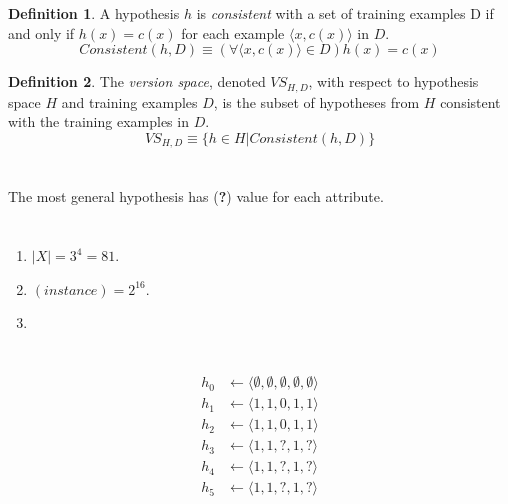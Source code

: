 \documentclass[10pt]{article}
\theoremstyle{definition}
\newtheorem{definition}{Definition}
\begin{document}
\begin{definition}
    A hypothesis $h$ is \emph{consistent} with a set of training examples D if
    and only if $h(x) = c(x)$ for each example $\langle x, c(x)\rangle$ in $D$.
    \[Consistent(h,D)\equiv(\forall\langle x,c(x)\rangle\in D) h(x)=c(x)\]
\end{definition}

\begin{definition}
    The \emph{version space}, denoted $VS_{H,D}$, with respect to hypothesis
    space $H$ and training examples $D$, is the subset of hypotheses from $H$
    consistent with the training examples in $D$.
    \[VS_{H,D}\equiv\{h\in H | Consistent(h,D)\}\]
    \end{definition}

\section{}
The most general hypothesis has (\textbf{?}) value for each attribute.

\section{}
\begin{enumerate}[label={\alph*)},font={\color{red!50!black}\bfseries}]
    \item $|X| = 3^4 = 81$.
    \item $(instance) = 2^{16}$.
    \item 
\end{enumerate}

\section{}

\begin{align*}
    h_0 &\leftarrow \langle \emptyset, \emptyset, \emptyset, \emptyset,
    \emptyset \rangle \\
    h_1 &\leftarrow \langle 1, 1, 0, 1, 1 \rangle \\
    h_2 &\leftarrow \langle 1, 1, 0, 1, 1 \rangle \\
    h_3 &\leftarrow \langle 1, 1, ?, 1, ? \rangle \\
    h_4 &\leftarrow \langle 1, 1, ?, 1, ? \rangle \\
    h_5 &\leftarrow \langle 1, 1, ?, 1, ? \rangle
\end{align*}

\section{}
\end{document}
